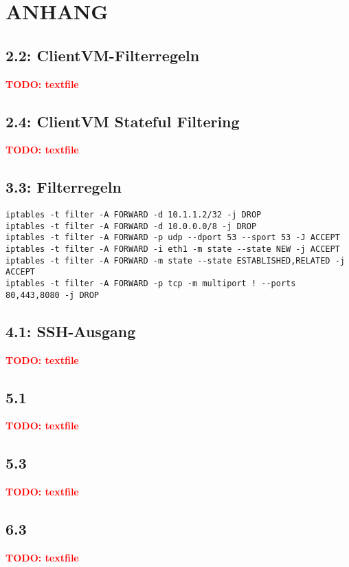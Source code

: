 \documentclass[twoside]{article}
\newcommand{\todo}[1]{\textcolor{red}{\begin{Huge}
	\begin{center}
		\textbf{TODO: #1}
	\end{center}
\end{Huge}}}
\begin{document}
\section*{ANHANG}
\label{sec:app}
	\subsection*{2.2: ClientVM-Filterregeln}
	\label{2.2-1}
	\todo{textfile}
	\subsection*{2.4: ClientVM Stateful Filtering}
	\label{2.4-1}
	\todo{textfile}
	\subsection*{3.3: Filterregeln}
	\label{3.3-1}
	\begin{lstlisting}
iptables -t filter -A FORWARD -d 10.1.1.2/32 -j DROP
iptables -t filter -A FORWARD -d 10.0.0.0/8 -j DROP
iptables -t filter -A FORWARD -p udp --dport 53 --sport 53 -J ACCEPT
iptables -t filter -A FORWARD -i eth1 -m state --state NEW -j ACCEPT
iptables -t filter -A FORWARD -m state --state ESTABLISHED,RELATED -j ACCEPT
iptables -t filter -A FORWARD -p tcp -m multiport ! --ports 80,443,8080 -j DROP
	\end{lstlisting}
	\subsection*{4.1: SSH-Ausgang}
	\label{a4-1}
	\todo{textfile}
	\subsection*{5.1}
	\label{a5-1}
	\todo{textfile}
	\subsection*{5.3}
	\label{a5-3}
	\todo{textfile}
	\subsection*{6.3}
	\label{a6-3}
	\todo{textfile}
\end{document}
